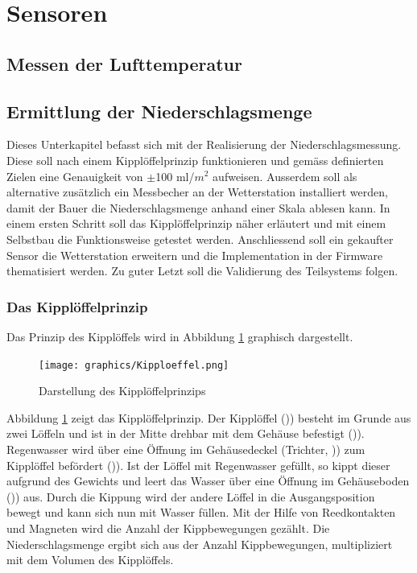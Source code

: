 \section{Sensoren}
\label{chap:Sensoren}
\subsection{Messen der Lufttemperatur}
\subsection{Ermittlung der Niederschlagsmenge}
Dieses Unterkapitel befasst sich mit der Realisierung der Niederschlagsmessung. Diese soll nach einem Kipplöffelprinzip funktionieren und gemäss definierten Zielen eine Genauigkeit von $\pm$100 ml/$m^2$ aufweisen. Ausserdem soll als alternative zusätzlich ein Messbecher an der Wetterstation installiert werden, damit der Bauer die Niederschlagsmenge anhand einer Skala ablesen kann. In einem ersten Schritt soll das Kipplöffelprinzip näher erläutert und mit einem Selbstbau die Funktionsweise getestet werden. Anschliessend soll ein gekaufter Sensor die Wetterstation erweitern und die Implementation in der Firmware thematisiert werden. Zu guter Letzt soll die Validierung des Teilsystems folgen.
\subsubsection*{Das Kipplöffelprinzip}
Das Prinzip des Kipplöffels wird in Abbildung \ref{fig:Kipp} graphisch dargestellt.

\begin{figure}[h]
\centering
\texttt{[image: graphics/Kipploeffel.png]}
\caption{Darstellung des Kipplöffelprinzips}
\label{fig:Kipp}
\end{figure}

Abbildung \ref{fig:Kipp} zeigt das Kipplöffelprinzip. Der Kipplöffel ()\grqq) besteht im Grunde aus zwei Löffeln und ist in der Mitte drehbar mit dem Gehäuse befestigt ()\grqq). Regenwasser wird über eine Öffnung im Gehäusedeckel (Trichter, )\grqq) zum Kipplöffel befördert ()\grqq). Ist der Löffel mit Regenwasser gefüllt, so kippt dieser aufgrund des Gewichts und leert das Wasser über eine Öffnung im Gehäuseboden ()\grqq) aus. Durch die Kippung wird der andere Löffel in die Ausgangsposition bewegt und kann sich nun mit Wasser füllen. Mit der Hilfe von Reedkontakten und Magneten wird die Anzahl der Kippbewegungen gezählt. Die Niederschlagsmenge ergibt sich aus der Anzahl Kippbewegungen, multipliziert mit dem Volumen des Kipplöffels.
\newpage

